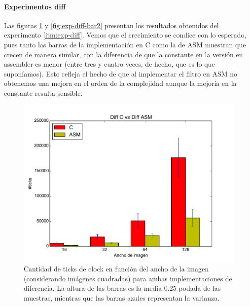 \paragraph*{Experimentos diff}
Las figuras \ref{fig:exp-diff-bar1} y \ref{fig:exp-diff-bar2} presentan los resultados obtenidos del experimento \ref{itm:exp-diff}. Vemos que el crecimiento se condice con lo esperado, pues tanto las barras de la implementación en C como la de ASM muestran que crecen de manera similar, con la diferencia de que la constante en la versión en assembler es menor (entre tres y cuatro veces, de hecho, que es lo que suponíamos). Esto refleja el hecho de que al implementar el filtro en ASM no obtenemos una mejora en el orden de la complejidad aunque la mejoría en la constante resulta sensible.

\begin{figure}[H]
\centering
\begin{minipage}{0.45\textwidth}
  \centering
    \includegraphics[width=1\textwidth]{../graficos/barplot_diff1}
  \caption{\footnotesize Cantidad de ticks de clock en función del ancho de la imagen (considerando imágenes cuadradas) para ambas implementaciones de diferencia. La altura de las barras es la media 0.25-podada de las muestras, mientras que las barras azules representan la varianza.}
  \label{fig:exp-diff-bar1}
\end{minipage}%
\hspace{0.03\textwidth}
\begin{minipage}{0.45\textwidth}   
  \centering

\end{minipage}
\end{figure}

